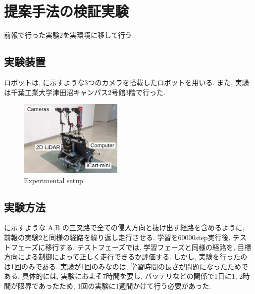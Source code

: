 \documentclass{jarticle}
\begin{document}

\section{提案手法の検証実験}
前報\cite{mech}で行った実験2を実環境に移して行う.
\subsection{実験装置}
ロボットは, に示すような3つのカメラを搭載したロボットを用いる. また, 実験は千葉工業大学津田沼キャンパス2号館3階で行った.

\begin{figure}[h]
  \centering
   \includegraphics[width=50mm]{gamma3.png}
   \vspace*{-4mm}
   \caption{Experimental setup}
   \label{fig: fig6}
 \end{figure}

 \subsection{実験方法}
 に示すような A,B の三叉路で全ての侵入方向と抜け出す経路を含めるように, 前報\cite{mech}の実験2と同様の経路を繰り返し走行させる. 学習を60000step実行後, テストフェーズに移行する. テストフェーズでは, 学習フェーズと同様の経路を, 目標方向による制御によって正しく走行できるか評価する. しかし, 実験を行ったのは1回のみである. 実験が1回のみなのは, 学習時間の長さが問題になったためである. 具体的には, 実験におよそ7時間を要し, バッテリなどの関係で1日に1, 2時間が限界であったため, 1回の実験に1週間かけて行う必要があった.
\end{document}
